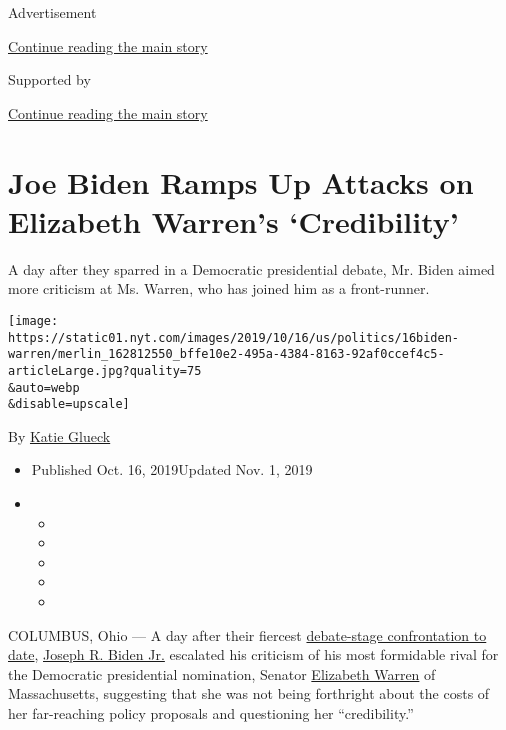 Advertisement

\protect\hyperlink{after-top}{Continue reading the main story}

Supported by

\protect\hyperlink{after-sponsor}{Continue reading the main story}

\hypertarget{joe-biden-ramps-up-attacks-on-elizabeth-warrens-credibility}{%
\section{Joe Biden Ramps Up Attacks on Elizabeth Warren's
`Credibility'}\label{joe-biden-ramps-up-attacks-on-elizabeth-warrens-credibility}}

A day after they sparred in a Democratic presidential debate, Mr. Biden
aimed more criticism at Ms. Warren, who has joined him as a
front-runner.

\texttt{[image: https://static01.nyt.com/images/2019/10/16/us/politics/16biden-warren/merlin\_162812550\_bffe10e2-495a-4384-8163-92af0ccef4c5-articleLarge.jpg?quality=75\\\&auto=webp\\\&disable=upscale]}

By \href{https://www.nytimes.com/by/katie-glueck}{Katie Glueck}

\begin{itemize}
\item
  Published Oct. 16, 2019Updated Nov. 1, 2019
\item
  \begin{itemize}
  \item
  \item
  \item
  \item
  \item
  \end{itemize}
\end{itemize}

COLUMBUS, Ohio --- A day after their fiercest
\href{https://www.nytimes.com/2019/10/16/us/politics/democratic-debate.html}{debate-stage
confrontation to date},
\href{https://www.nytimes.com/2019/11/01/us/politics/iowa-poll-warren-biden.html}{Joseph
R. Biden Jr.} escalated his criticism of his most formidable rival for
the Democratic presidential nomination, Senator
\href{https://www.nytimes.com/2019/11/01/us/politics/iowa-poll-warren-biden.html}{Elizabeth
Warren} of Massachusetts, suggesting that she was not being forthright
about the costs of her far-reaching policy proposals and questioning her
``credibility.''

